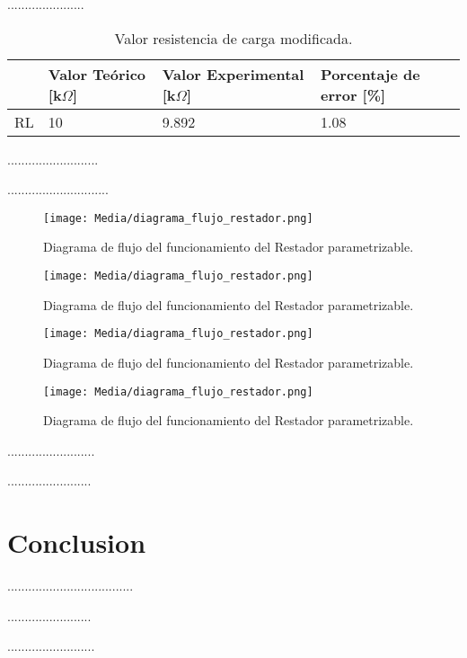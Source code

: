 \documentclass[journal]{IEEEtran}
\begin{document}
\par ......................

\begin{table}[h]
\caption{Valor resistencia de carga modificada.}
    \centering
    \renewcommand{\arraystretch}{1.2} %
    \begin{tabular}{|l|p{2cm}|p{2cm}|p{2cm}|}
        \hline
        & \textbf{Valor Teórico [k$\Omega$]} & \textbf{Valor Experimental [k$\Omega$]} & \textbf{Porcentaje de error [\%]} \\
        \hline
        RL & 10  & 9.892  & 1.08 \\
        \hline
    \end{tabular}
    
    \label{tab:resistencia_carga}
\end{table}
\par ..........................
\par .............................

\begin{figure}[H]
    \centering
    \texttt{[image: Media/diagrama\_flujo\_restador.png]}
    \caption{Diagrama de flujo del funcionamiento del Restador parametrizable.}
    \label{fig:diagrama_flujo_restador}
\end{figure}
\begin{figure}[H]
    \centering
    \texttt{[image: Media/diagrama\_flujo\_restador.png]}
    \caption{Diagrama de flujo del funcionamiento del Restador parametrizable.}
    \label{fig:diagrama_flujo_restador}
\end{figure}
\begin{figure}[H]
    \centering
    \texttt{[image: Media/diagrama\_flujo\_restador.png]}
    \caption{Diagrama de flujo del funcionamiento del Restador parametrizable.}
    \label{fig:diagrama_flujo_restador}
\end{figure}
\begin{figure}[H]
    \centering
    \texttt{[image: Media/diagrama\_flujo\_restador.png]}
    \caption{Diagrama de flujo del funcionamiento del Restador parametrizable.}
    \label{fig:diagrama_flujo_restador}
\end{figure}

\par .........................
\par ........................


\section{Conclusion}
\par ....................................
\par ........................
\par .........................
\end{document}
